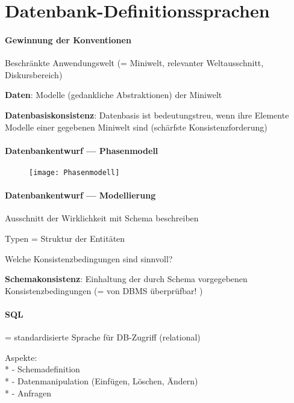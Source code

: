 \section{Datenbank-Definitionssprachen}
\label{sec:definitionssprachen}

\paragraph{Gewinnung der Konventionen}
\begin{items}
	\item Beschränkte Anwendungswelt (= Miniwelt, relevanter Weltausschnitt, Diskursbereich)
	\item \textbf{Daten}: Modelle (gedankliche Abstraktionen) der Miniwelt
	\item \textbf{Datenbasiskonsistenz}: Datenbasis ist bedeutungstreu, wenn ihre Elemente Modelle einer gegebenen Miniwelt sind (schärfste Konsistenzforderung)
\end{items}

\paragraph{Datenbankentwurf --- Phasenmodell}
\begin{figure}[H]\centering\label{Phasenmodell}\texttt{[image: Phasenmodell]}\end{figure}

\paragraph{Datenbankentwurf --- Modellierung}
\begin{items}
	\item Ausschnitt der Wirklichkeit mit Schema beschreiben
	\item Typen = Struktur der Entitäten
	\item Welche Konsistenzbedingungen sind sinnvoll?
	\item \textbf{Schemakonsistenz}: Einhaltung der durch Schema vorgegebenen Konsistenzbedingungen (= von DBMS überprüfbar! )
\end{items}

\paragraph{SQL}
\begin{items}
	\item = standardisierte Sprache für DB-Zugriff (relational)
	\item Aspekte: \\*
		- Schemadefinition \\*
		- Datenmanipulation (Einfügen, Löschen, Ändern) \\*
		- Anfragen
\end{items}



